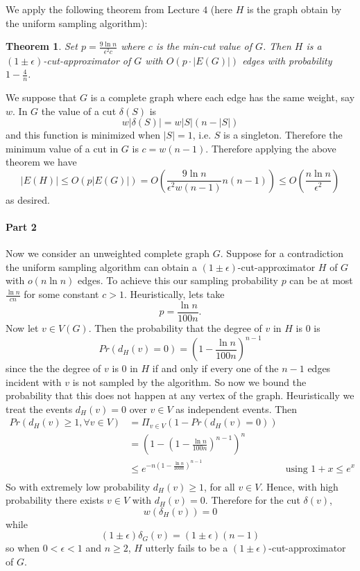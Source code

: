 \documentclass[letterpaper,12pt,oneside,onecolumn]{article}
\newtheorem{theorem}[fact]{Theorem}
\begin{document}
\newpage
\section{}
\paragraph{}
We apply the following theorem from Lecture $4$ (here $H$ is the graph obtain by the uniform sampling algorithm):
\begin{theorem}
	Set $p=\frac{9\ln n}{\epsilon^2 c}$ where $c$ is the min-cut value of $G$. Then $H$ is a $(1\pm \epsilon)$-cut-approximator of $G$ with $O(p\cdot |E(G)|)$ edges with probability $1-\frac{4}{n}$.
\end{theorem}
We suppose that $G$ is a complete graph where each edge has the same weight, say $w$. In $G$ the value of a cut $\delta(S)$ is
$$w|\delta(S)| = w|S|(n-|S|)$$
and this function is minimized when $|S| = 1$, i.e. $S$ is a singleton. Therefore the minimum value of a cut in $G$ is $c = w(n-1)$. Therefore applying the above theorem we have
$$|E(H)| \leq O(p|E(G)|) = O(\frac{9\ln n}{\epsilon^2 w (n-1)}n(n-1)) \leq O(\frac{n\ln n}{\epsilon^2})$$
as desired.
\paragraph{Part 2}
Now we consider an unweighted complete graph $G$. Suppose for a contradiction the uniform sampling algorithm can obtain a  $(1\pm \epsilon)$-cut-approximator $H$ of $G$ with $o(n\ln n)$ edges. To achieve this our sampling probability $p$ can be at most $\frac{\ln n}{c n}$ for some constant $c>1$. Heuristically, lets take
$$p= \frac{\ln n}{100 n}.$$
Now let $v \in V(G)$. Then the probability that the degree of $v$ in $H$ is $0$ is
$$Pr(d_H(v) = 0) = (1- \frac{\ln n}{100n})^{n-1}$$
since the the degree of $v$ is $0$ in $H$ if and only if every one of the $n-1$ edges incident with $v$ is not sampled by the algorithm. So now we bound the probability that this does not happen at any vertex of the graph. Heuristically we treat the events $d_H(v) = 0$ over $v \in V$ as independent events. Then
\begin{align*}
Pr(d_H(v) \geq 1, \forall v \in V) &= \Pi_{v\in V} (1-Pr(d_H(v) = 0)) \\
&=(1-(1- \frac{\ln n}{100n})^{n-1})^n \\
&\leq e^{-n(1- \frac{\ln n}{100n})^{n-1}} &\text{using $1+x \leq e^x$} \\
\end{align*} 
So with extremely low probability $d_H(v) \geq 1$, for all $v \in V$. Hence, with high probability there exists $v \in V$ with $d_H(v) = 0$. Therefore for the cut $\delta(v)$, 
$$w(\delta_H(v)) = 0$$
while 
$$(1\pm \epsilon)\delta_G(v) = (1\pm \epsilon)(n-1)$$
so when $0 <\epsilon < 1$ and $n\geq 2$, $H$ utterly fails to be a $(1\pm \epsilon)$-cut-approximator of $G$.
\newpage
\section{}
\end{document}
